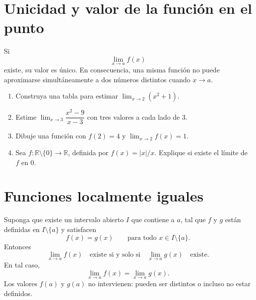 \documentclass[10pt,a5paper]{article}
\newif\ifmostrarSoluciones
\begin{document}
\section*{Unicidad y valor de la función en el punto}

\begin{teorema}
Si
\[
  \lim_{x\to a}f(x)
\]
existe, su valor es único. En consecuencia, una misma función no puede aproximarse simultáneamente a dos números distintos cuando $x\to a$.
\end{teorema}

\begin{ejercicios}
\begin{enumerate}
  \item Construya una tabla para estimar $\displaystyle\lim_{x\to2}(x^2+1)$.
  \item Estime $\displaystyle\lim_{x\to3}\dfrac{x^2-9}{x-3}$ con tres valores a cada lado de $3$.
  \item Dibuje una función con $f(2)=4$ y $\displaystyle\lim_{x\to2}f(x)=1$.
  \item Sea $f\colon\mathbb{R}\setminus\{0\}\to\mathbb{R}$, definida por $f(x)=|x|/x$. Explique si existe el límite de $f$ en $0$.
\end{enumerate}
\end{ejercicios}

\ifmostrarSoluciones
\begin{solucion}[de los ejercicios]
\begin{enumerate}
  \item Los valores se aproximan a $5$.
  \item Para $x\neq3$, el cociente es $x+3$; la tabla se aproxima a $6$.
  \item Por ejemplo, $f\colon\mathbb{R}\to\mathbb{R}$, definida por
  \[
    f(x)=
    \begin{cases}
      1, & x\neq2,\\
      4, & x=2.
    \end{cases}
  \]
  \item No existe: los límites laterales son $-1$ y $1$.
\end{enumerate}
\end{solucion}
\fi
\section*{Funciones localmente iguales}

\begin{proposicion}
Suponga que existe un intervalo abierto $I$ que contiene a $a$, tal que $f$ y $g$ están definidas en $I\setminus\{a\}$ y satisfacen
\[
  f(x)=g(x)\qquad\text{para todo }x\in I\setminus\{a\}.
\]
Entonces
\[
  \lim_{x\to a}f(x)
  \quad\text{existe si y solo si}\quad
  \lim_{x\to a}g(x)
  \quad\text{existe}.
\]
En tal caso,
\[
  \lim_{x\to a}f(x)=\lim_{x\to a}g(x).
\]
Los valores $f(a)$ y $g(a)$ no intervienen: pueden ser distintos o incluso no estar definidos.
\end{proposicion}
\end{document}
